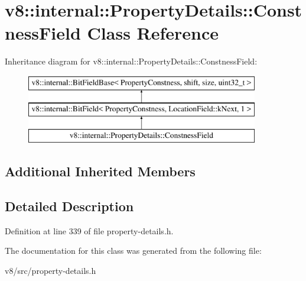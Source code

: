 \hypertarget{classv8_1_1internal_1_1PropertyDetails_1_1ConstnessField}{}\section{v8\+:\+:internal\+:\+:Property\+Details\+:\+:Constness\+Field Class Reference}
\label{classv8_1_1internal_1_1PropertyDetails_1_1ConstnessField}
Inheritance diagram for v8\+:\+:internal\+:\+:Property\+Details\+:\+:Constness\+Field\+:\begin{figure}[H]
\begin{center}
\leavevmode
\includegraphics[height=3.000000cm]{classv8_1_1internal_1_1PropertyDetails_1_1ConstnessField}
\end{center}
\end{figure}
\subsection*{Additional Inherited Members}


\subsection{Detailed Description}


Definition at line 339 of file property-\/details.\+h.



The documentation for this class was generated from the following file\+:\begin{DoxyCompactItemize}
\item 
v8/src/property-\/details.\+h\end{DoxyCompactItemize}
